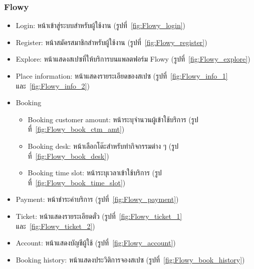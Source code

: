 \subsubsection{Flowy}
\begin{itemize}
    \item Login: หน้าเข้าสู่ระบบสําหรับผู้ใช้งาน (รูปที่~\ref{fig:Flowy_login})
    \item Register: หน้าสมัครสมาชิกสําหรับผู้ใช้งาน (รูปที่~\ref{fig:Flowy_register})
    \item Explore: หน้าแสดงสเปซที่ให้บริการบนแพลตฟอร์ม Flowy (รูปที่~\ref{fig:Flowy_explore})
    \item Place information: หน้าแสดงรายระเอียดของสเปซ (รูปที่~\ref{fig:Flowy_info_1} และ~\ref{fig:Flowy_info_2})
    \item Booking
    \begin{itemize}
        \item Booking customer amount: หน้าระบุจํานวนผู้เข้าใช้บริการ (รูปที่~\ref{fig:Flowy_book_ctm_amt})
        \item Booking desk: หน้าเลือกโต๊ะสําหรับทํากิจกรรมต่าง ๆ (รูปที่~\ref{fig:Flowy_book_desk})
        \item Booking time slot: หน้าระบุเวลาเข้าใช้บริการ (รูปที่~\ref{fig:Flowy_book_time_slot})
    \end{itemize}
    \item Payment: หน้าชําระค่าบริการ (รูปที่~\ref{fig:Flowy_payment})
    \item Ticket: หน้าแสดงรายระเอียดตั๋ว (รูปที่~\ref{fig:Flowy_ticket_1} และ~\ref{fig:Flowy_ticket_2})
    \item Account: หน้าแสดงบัญชีผู้ใช้ (รูปที่~\ref{fig:Flowy_account})
    \item Booking history: หน้าแสดงประวิติการจองสเปซ (รูปที่~\ref{fig:Flowy_book_history})
\end{itemize}

